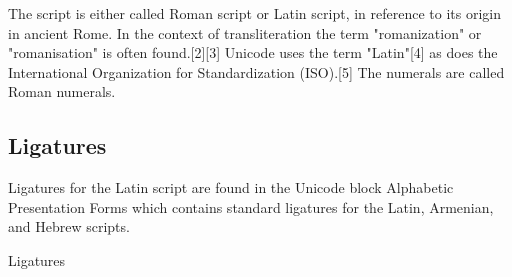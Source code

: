 The script is either called Roman script or Latin script, in reference to its origin in ancient Rome. In the context of transliteration the term "romanization" or "romanisation" is often found.[2][3] Unicode uses the term "Latin"[4] as does the International Organization for Standardization (ISO).[5] The numerals are called Roman numerals.


\subsection{Ligatures}

\newfontfamily{}

Ligatures for the Latin script are found in the Unicode block Alphabetic Presentation Forms which contains standard ligatures for the Latin, Armenian, and Hebrew scripts.

\begin{scriptexample}[]{Ligatures}
\end{scriptexample}













